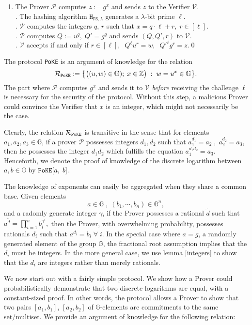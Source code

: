 \documentclass[11pt, lettersize, notitlepage, leqno, footskip=0.6cm]{article}
\newcommand{\bz}{\mathbb Z}
\newcommand{\ttt}{\texttt}
\newcommand{\bG}{\mathbb{G}}
\newcommand{\wti}{\widetilde}
\newcommand{\mc}{\mathcal}
\newcommand{\mb}{\mathbb}
\newcommand{\lam}{\lambda}
\newcommand{\lamb}{\lambda}
\newcommand{\mP}{\mc{P}}
\newcommand{\vs}{\vspace{-0.15cm}}
\newcommand{\noin}{\noindent}
\numberwithin{equation}{section}
\begin{document}
\begin{enumerate}[wide, labelwidth=!, labelindent=0pt]\vs \item The Prover $\mc{P}$ computes $z:= g^x$ and sends $z$ to the Verifier $\mc{V}$.\\
\noin 2. The hashing algorithm $\ttt{H}_{\ttt{FS},\lam}$ generates a $\lamb$-bit prime $\ell$.\\
\noin 3. $\mc{P}$ computes the integers $q$, $r$ such that $x = q \cdot \ell+r,\; r\in [\ell].$\\
\noin 4. $\mc{P}$ computes $Q:= u^q,\; Q' = g^q$ and sends $(Q, Q', r)$ to $\mc{V}$.\\
\noin 5. $\mc{V}$ accepts if and only if $r\in [\ell],\;\; Q^{\ell}u^r =  w,\;\; Q'^{\ell}g^r = z. $\qed \end{enumerate}

\noin The protocol \verb|PoKE| is an argument of knowledge for the relation \vs $$\mc{R}_{\tt{PoKE}}:= \big\{\big((u,w)\in \bG);\; x\in \bz\big)\;:\; w = u^x \in \bG  \big\}.$$ The part where $\mc{P}$ computes $g^x$ and sends it to $\mc{V}$ \textit{before} receiving the challenge $\ell$ is necessary for the security of the protocol. Without this step, a malicious Prover could convince the Verifier that $x$ is an integer, which might not necessarily be the case.

Clearly, the relation $\mc{R}_{\tt{PoKE}}$ is transitive in the sense that for elements $a_1,a_2,a_3\in\mb{G}$, if a prover $\mP$ possesses integers $d_1,d_2$ such that $a_1^{d_1} = a_2\;,\;a_2^{d_2} = a_3$, then he possesses the integer $d_1d_2$ which fulfills the equation $a_1^{d_1d_2} = a_3$. Henceforth, we denote the proof of knowledge of the discrete logarithm between $a,b\in\mb{G}$ by $\verb|PoKE|[a,\;b]$.

The knowledge of exponents can easily be aggregated when they share a common base. Given elements \vs $$a\in\mb{G}\;,\;(b_1,\cdots,b_n)\in\mb{G}^n, $$ and a radomly generate integer $\gamma$, if the Prover possesses a rational $\wti{d}$ such that $a^{\wti{d}} = \prod_{i=1}^n b_i^{\gamma^i},$ then the Prover, with overwhelming probability, possesses rationals $d_i$ such that $a^{d_i} = b_i\;\forall\;i$. In the special case where $a = g$, a randomly generated element of the group $\bG$, the fractional root assumption implies that the $d_i$ must be integers. In the more general case, we use lemma \ref{integers} to show that the $d_i$ are integers rather than merely rationals.

We now start out with a fairly simple protocol. We show how a Prover could probabilistically demonstrate that two discrete logarithms are equal, with a constant-sized proof. In other words, the protocol allows a Prover to show that two pairs $[a_1, b_1]$, $[a_2, b_2]$ of $\bG$-elements are commitments to the same set/multiset. We provide an argument of knowledge for  the following relation:\vs
\end{document}
